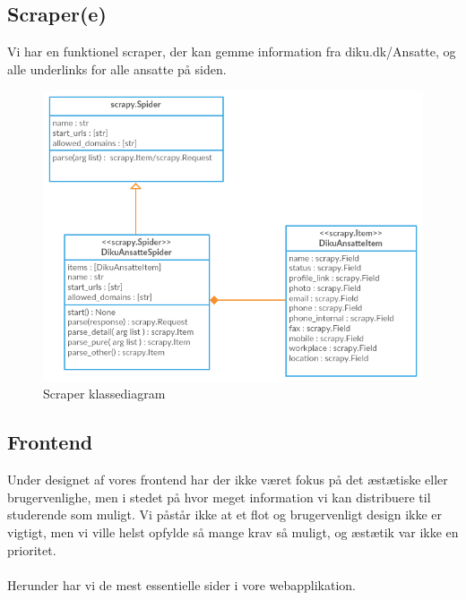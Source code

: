 \documentclass[12pt]{article}
\begin{document}
\subsection{Scraper(e)}
Vi har en funktionel scraper, der kan gemme information fra diku.dk/Ansatte, og alle underlinks for alle ansatte på siden.\\

\begin{figure}[H]
    \centering
    \includegraphics[scale=0.5]{scraper_class_diagram.png}
    \caption{Scraper klassediagram}
    \label{fig:scraper_class_diagram}
\end{figure}

\subsection{Frontend}
Under designet af vores frontend har der ikke været fokus på det æstætiske eller brugervenlighe, men i stedet på hvor meget information vi kan distribuere til studerende som muligt. Vi påstår ikke at et flot og brugervenligt design ikke er vigtigt, men vi ville helst opfylde så mange krav så muligt, og æstætik var ikke en prioritet.\\
\\
Herunder har vi de mest essentielle sider i vore webapplikation.
\end{document}
